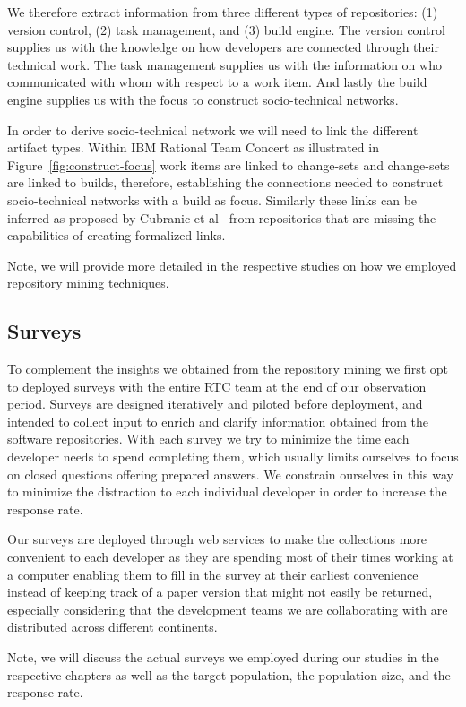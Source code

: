 We therefore extract information from three different types of repositories: (1) version control, (2) task management, and (3) build engine.
The version control supplies us with the knowledge on how developers are connected through their technical work.
The task management supplies us with the information on who communicated with whom with respect to a work item.
And lastly the build engine supplies us with the focus to construct socio-technical networks.

In order to derive socio-technical network we will need to link the different artifact types.
Within IBM Rational Team Concert as illustrated in Figure~\ref{fig:construct-focus} work items are linked to change-sets and change-sets are linked to builds, therefore, establishing the connections needed to construct socio-technical networks with a build as focus.
Similarly these links can be inferred as proposed by Cubranic et al~\cite{cubranic:tse:2005} from repositories that are missing the capabilities of creating formalized links.

Note, we will provide more detailed in the respective studies on how we employed repository mining techniques.

\subsection{Surveys}
To complement the insights we obtained from the repository mining we first opt to deployed surveys with the entire RTC team at the end of our observation period. 
Surveys are designed iteratively and piloted before deployment, and intended to collect input to enrich and clarify information obtained from the software repositories. 
With each survey we try to minimize the time each developer needs to spend completing them, which usually limits ourselves to focus on closed questions offering prepared answers.
We constrain ourselves in this way to minimize the distraction to each individual developer in order to increase the response rate.

Our surveys are deployed through web services to make the collections more convenient to each developer as they are spending most of their times working at a computer enabling them to fill in the survey at their earliest convenience instead of keeping track of a paper version that might not easily be returned, especially considering that the development teams we are collaborating with are distributed across different continents.

Note, we will discuss the actual surveys we employed during our studies in the respective chapters as well as the target population, the population size, and the response rate.


